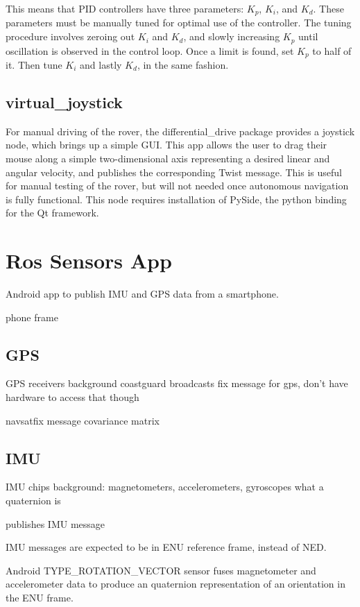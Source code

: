 This means that PID controllers have three parameters: \(K_p\), \(K_i\), and \(K_d\). These parameters must be manually tuned for optimal use of the controller. The tuning procedure involves zeroing out \(K_i\) and \(K_d\), and slowly increasing \(K_p\) until oscillation is observed in the control loop. Once a limit is found, set \(K_p\) to half of it. Then tune \(K_i\) and lastly \(K_d\), in the same fashion. 

\subsection{virtual\_joystick}
For manual driving of the rover, the differential\_drive package provides a joystick node, which brings up a simple GUI. This app allows the user to drag their mouse along a simple two-dimensional axis representing a desired linear and angular velocity, and publishes the corresponding Twist message. This is useful for manual testing of the rover, but will not needed once autonomous navigation is fully functional. This node requires installation of PySide, the python binding for the Qt framework.

\section{Ros Sensors App}
Android app to publish IMU and GPS data from a smartphone.

phone frame

\subsection{GPS}
GPS receivers background
coastguard broadcasts fix message for gps, don't have hardware to access that though

navsatfix message
covariance matrix

\subsection{IMU}
IMU chips background: magnetometers, accelerometers, gyroscopes
what a quaternion is

publishes IMU message

IMU messages are expected to be in ENU reference frame, instead of NED.

Android TYPE\_ROTATION\_VECTOR sensor fuses magnetometer and accelerometer data to produce an quaternion representation of an orientation in the ENU frame.

